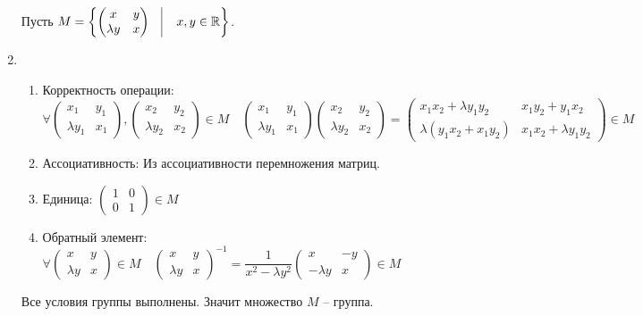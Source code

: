 \begin{solution}
    \begin{enumerate}[label=\alph*)]
        Пусть \(M = \left\{ \begin{pmatrix} x & y \\ \lambda y & x \end{pmatrix} \quad \vline \quad x, y \in \mathbb{R} \right\}\).
        \item \begin{enumerate}[label=\arabic*)]
            \item Корректность операции: \\
            \( \forall \begin{pmatrix}
                x_1 & y_1 \\
                \lambda y_1 & x_1
            \end{pmatrix}, \begin{pmatrix}
                x_2 & y_2 \\
                \lambda y_2 & x_2
            \end{pmatrix} \in M \quad 
            \begin{pmatrix}
                x_1 & y_1 \\
                \lambda y_1 & x_1
            \end{pmatrix} \begin{pmatrix}
                x_2 & y_2 \\
                \lambda y_2 & x_2
            \end{pmatrix} = \begin{pmatrix}
                x_1 x_2 + \lambda y_1 y_2 & x_1 y_2 + y_1 x_2 \\
                \lambda (y_1 x_2 + x_1 y_2) & x_1 x_2 + \lambda y_1 y_2
            \end{pmatrix} \in M
            \)
            \item Ассоциативность: Из ассоциативности перемножения матриц.
            \item Единица: \( \begin{pmatrix} 1 & 0 \\ 0 & 1 \end{pmatrix} \in M \)
            \item Обратный элемент:
            \(
            \forall \begin{pmatrix}
                x & y \\
                \lambda y & x
            \end{pmatrix} \in M \quad
            \begin{pmatrix}
                x & y \\
                \lambda y & x
            \end{pmatrix}^{-1} = \dfrac{1}{x^2 - \lambda y^2}\begin{pmatrix}
                x & -y \\
                -\lambda y & x
            \end{pmatrix} \in M
            \)
        \end{enumerate}
        Все условия группы выполнены. Значит множество \(M\) -- группа.
        

\end{enumerate}
\end{solution}

